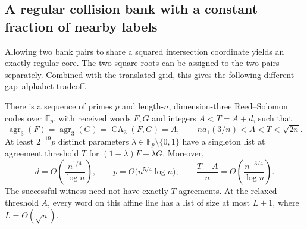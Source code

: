 \subsection{A regular collision bank with a constant fraction of nearby labels}
\label{subsec:collision-bank-constant-fraction}

Allowing two bank pairs to share a squared intersection coordinate yields
an exactly regular core.  The two square roots can be assigned to the two
pairs separately.  Combined with the translated grid, this gives the
following different gap--alphabet tradeoff.

\begin{theorem}
\label{thm:collision-bank-constant-fraction}
There is a sequence of primes $p$ and length-$n$, dimension-three
Reed--Solomon codes over $\mathbb F_p$, with received words $F,G$ and
integers $A<T=A+d$, such that
\[
 \operatorname{agr}_3(F)=\operatorname{agr}_3(G)
   =\operatorname{CA}_3(F,G)=A,
 \qquad n a_1(3/n)<A<T<\sqrt{2n}.
\]
At least $2^{-19}p$ distinct parameters
$\lambda\in\mathbb F_p\setminus\{0,1\}$ have a singleton list at
agreement threshold $T$ for $(1-\lambda)F+\lambda G$.  Moreover,
\[
 d=\Theta\!\left(\frac{n^{1/4}}{\log n}\right),\qquad
 p=\Theta\bigl(n^{5/4}\log n\bigr),\qquad
 \frac{T-A}{n}=\Theta\!\left(\frac{n^{-3/4}}{\log n}\right).
\]
The successful witness need not have exactly $T$ agreements.  At the
relaxed threshold $A$, every word on this affine line has a list of size
at most $L+1$, where $L=\Theta(\sqrt n)$.
\end{theorem}
